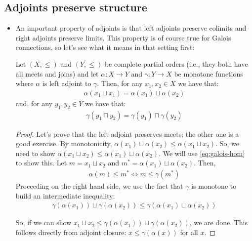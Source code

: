 \subsection{Adjoints preserve structure}
\begin{itemize}
  \item An important property of adjoints is that left adjoints preserve colimits 
  and right adjoints preserve limits. This property is of course true for 
  Galois connections, so let's see what it means in that setting first:
  \begin{theorem}
    Let $(X, \le)$ and $(Y, \le)$ be complete partial orders (i.e., they both have all 
    meets and joins) and let $\alpha : X \to Y$ and $\gamma : Y
    \to X$ be monotone functions where $\alpha$ is left adjoint to $\gamma$. Then,
    for any $x_1, x_2 \in X$ we have that:
    \begin{align}
    \alpha(x_1 \sqcup x_1) = \alpha(x_1) \sqcup \alpha(x_2)
    \end{align}
    and, for any $y_1, y_2 \in Y$ we have that:
    \begin{align}
      \gamma(y_1 \sqcap y_2) = \gamma(y_1) \sqcap \gamma(y_2)
    \end{align}
  \end{theorem}
  \begin{proof}
    Let's prove that the left adjoint preserves meets; the other 
    one is a good exercise.
    By monotonicity, $\alpha(x_1) \sqcup \alpha(x_2) \le \alpha(x_1 \sqcup x_2)$. 
    So, we need to show $\alpha(x_1 \sqcup x_2) \le \alpha(x_1) \sqcup \alpha(x_2)$.
    We will use \cref{eq:galois-hom} to show this. 
    Let $m = x_1 \sqcup x_2$ and $m^* = \alpha(x_1)\sqcup \alpha(x_2)$. Then,
    \begin{align*}
      \alpha(m) \le m^* \iff m \le \gamma(m^*)
    \end{align*}
    Proceeding on the right hand side, 
    we use the fact that $\gamma$ is monotone to build an intermediate inequality:
    \begin{align*}
    \gamma(\alpha(x_1)) \sqcup \gamma(\alpha(x_2)) \le \gamma(\alpha(x_1)\sqcup \alpha(x_2))
    \end{align*}

    So, if we can show $x_1 \sqcup x_2 \le \gamma(\alpha(x_1)) \sqcup \gamma(\alpha(x_2))$, 
    we are done. This follows directly from adjoint closure: $x \le \gamma(\alpha(x))$ for all $x$.
  \end{proof}
\end{itemize}

